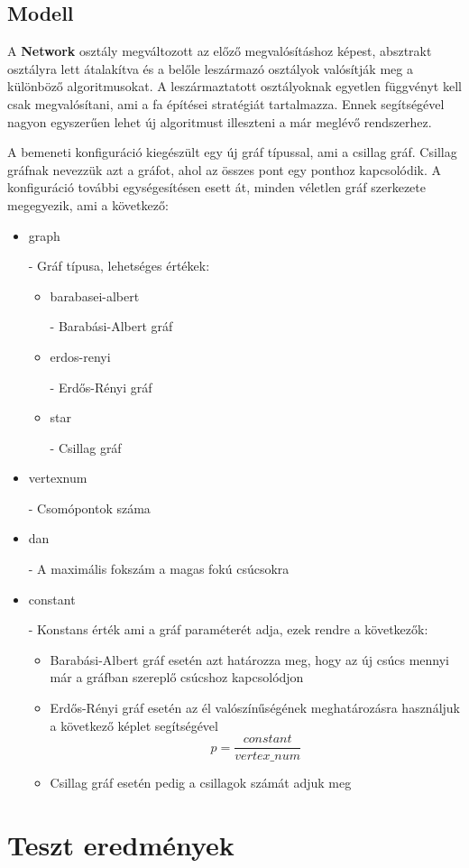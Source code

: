 \documentclass[12pt]{report}
\newcommand{\cmd}[1]{\colorbox{gray!10}{\strut #1}}
\begin{document}
\section{Modell}

A \textbf{Network} osztály megváltozott az előző megvalósításhoz képest, absztrakt osztályra lett átalakítva és a belőle leszármazó osztályok valósítják meg a különböző algoritmusokat.
A leszármaztatott osztályoknak egyetlen függvényt kell csak megvalósítani, ami a fa építései stratégiát tartalmazza.
Ennek segítségével nagyon egyszerűen lehet új algoritmust illeszteni a már meglévő rendszerhez.

A bemeneti konfiguráció kiegészült egy új gráf típussal, ami a csillag gráf.
Csillag gráfnak nevezzük azt a gráfot, ahol az összes pont egy ponthoz kapcsolódik.
A konfiguráció további egységesítésen esett át, minden véletlen gráf szerkezete megegyezik, ami a következő:

\begin{itemize}
	\item \cmd{graph} - Gráf típusa, lehetséges értékek:
	\begin{itemize}
		\item \cmd{barabasei-albert} - Barabási-Albert gráf
		\item \cmd{erdos-renyi} - Erdős-Rényi gráf
		\item \cmd{star} - Csillag gráf
	\end{itemize}
	
	\item \cmd{vertex\textunderscore num} - Csomópontok száma
	\item \cmd{dan} - A maximális fokszám a magas fokú csúcsokra
	\item \cmd{constant} - Konstans érték ami a gráf paraméterét adja, ezek rendre a következők:
	
	\begin{itemize}
		\item Barabási-Albert gráf esetén azt határozza meg, hogy az új csúcs mennyi már a gráfban szereplő csúcshoz kapcsolódjon
		\item Erdős-Rényi gráf esetén az él valószínűségének meghatározásra használjuk a következő képlet segítségével  \[p = \frac{constant}{vertex\_num}\]
		\item Csillag gráf esetén pedig a csillagok számát adjuk meg
	\end{itemize}
\end{itemize}

\chapter{Teszt eredmények}
\end{document}
